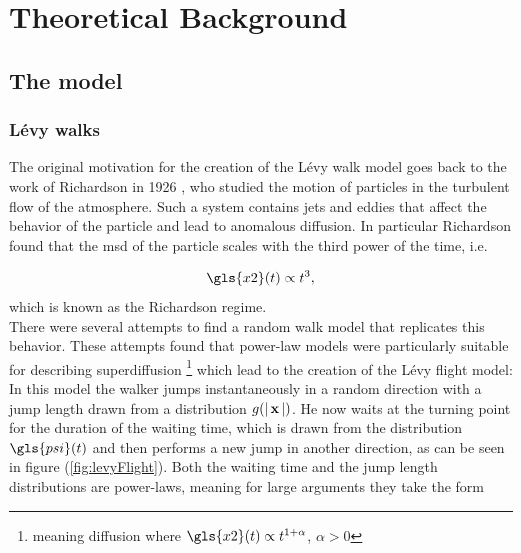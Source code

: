 \chapter{Theoretical Background}

\section{The model}

\subsection{L\'evy walks}

The original motivation for the creation of the L\'evy walk model goes back to the work of Richardson in 1926 \cite{richardson}, who studied the motion of particles in the turbulent flow of the atmosphere. Such a system contains jets and eddies that affect the behavior of the particle and lead to anomalous diffusion. In particular Richardson found that the \gls{msd} of the particle scales with the third power of the time, i.e.

\begin{align}
\gls{x2}(t) \propto t^3 ,
\end{align}
%
which is known as the Richardson regime.\\

There were several attempts to find a random walk model that replicates this behavior. These attempts found that power-law models were particularly suitable for describing superdiffusion \footnote{meaning diffusion where $\gls{x2}(t) \propto t^{1+\alpha}$, $\alpha>0$} which lead to the creation of the L\'evy flight model: In this model the walker jumps instantaneously in a random direction with a jump length drawn from a distribution $g(\left|\,\mathbf{ x }\,\right|)$. He now waits at the turning point for the duration of the waiting time, which is drawn from the distribution $\gls{psi}(t)$ and then performs a new jump in another direction, as can be seen in figure (\ref{fig:levyFlight}). Both the waiting time and the jump length distributions are power-laws, meaning for large arguments they take the form 

